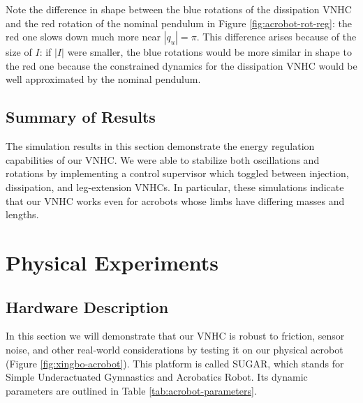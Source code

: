 \documentclass[journal,twoside,web, twocolumn,draftcls]{ieeecolor}
\begin{document}
Note the difference in shape between the blue rotations of the dissipation VNHC
and the red rotation of the nominal pendulum in Figure
\ref{fig:acrobot-rot-reg}: the red one slows down much more
near \(|q_u| = \pi\).
This difference arises because of the size of \(I\):
if \(|I|\) were smaller, the blue rotations would be more similar in shape to the
red one because the constrained dynamics for the dissipation VNHC would be
well approximated by the nominal pendulum.

\subsection{Summary of Results}
The simulation results in this section demonstrate the energy regulation
capabilities of our VNHC.  
We were able to stabilize both oscillations and rotations by implementing a
control supervisor which toggled between injection, dissipation, and
leg-extension VNHCs.
In particular, these simulations indicate that our VNHC
works even for acrobots whose limbs have differing masses and lengths.

\section{Physical Experiments}\label{sec:experiments}

\subsection{Hardware Description}
In this section we will demonstrate that our VNHC is robust to friction, sensor
noise, and other real-world considerations by testing it on our physical
acrobot (Figure \ref{fig:xingbo-acrobot}).
This platform is called SUGAR, which stands for
Simple Underactuated Gymnastics and Acrobatics Robot.
Its dynamic parameters are outlined in Table \ref{tab:acrobot-parameters}.
\end{document}
